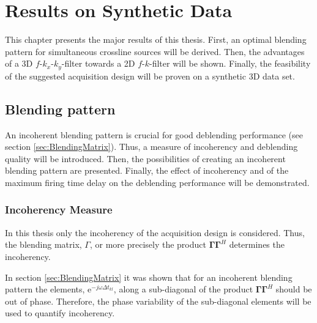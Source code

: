 \chapter{Results on Synthetic Data} \label{chap:ResultsSynData}

This chapter presents the major results of this thesis. First, an optimal blending pattern for simultaneous crossline sources will be derived. Then, the advantages of a 3D $f$-$k_x$-$k_y$-filter towards a 2D $f$-$k$-filter will be shown. Finally, the feasibility of the suggested acquisition design will be proven on a synthetic 3D data set. 
 
\section{Blending pattern}

An incoherent blending pattern is crucial for good deblending performance (see section \ref{sec:BlendingMatrix}). Thus, a measure of incoherency and deblending quality will be introduced. Then, the possibilities of creating an incoherent blending pattern are presented. Finally, the effect of incoherency and of the maximum firing time delay on the deblending performance will be demonstrated.

\subsection*{Incoherency Measure}

In this thesis only the incoherency of the acquisition design is considered. Thus, the blending matrix, $\Gamma$, or more precisely the product $\mathbf{\Gamma \Gamma}^H$ determines the incoherency.

In section \ref{sec:BlendingMatrix} it was shown that for an incoherent blending pattern the elements, $\mathrm{e}^{-j \omega \Delta t_{kl}}$, along a sub-diagonal of the product $\mathbf{\Gamma \Gamma}^H$ should be out of phase. Therefore, the phase variability of the sub-diagonal elements will be used to quantify incoherency.

